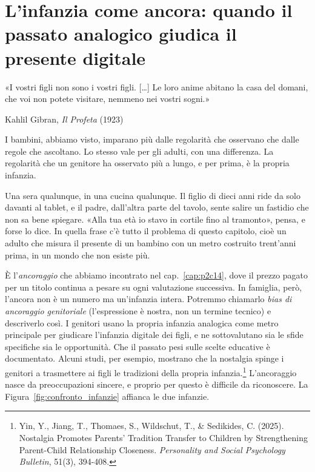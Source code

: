 \chapter{L'infanzia come ancora: quando il passato analogico giudica il presente digitale}
\label{cap:p2c29}

\epigraph{«I vostri figli non sono i vostri figli. [\dots] Le loro anime abitano la casa del domani, che voi non potete visitare, nemmeno nei vostri sogni.»}{Kahlil Gibran, \textit{Il Profeta} (1923)}

I bambini, abbiamo visto, imparano più dalle regolarità che osservano che dalle regole che ascoltano. Lo stesso vale per gli adulti, con una differenza. La regolarità che un genitore ha osservato più a lungo, e per prima, è la propria infanzia.

Una sera qualunque, in una cucina qualunque. Il figlio di dieci anni ride da solo davanti al tablet, e il padre, dall'altra parte del tavolo, sente salire un fastidio che non sa bene spiegare. «Alla tua età io stavo in cortile fino al tramonto», pensa, e forse lo dice. In quella frase c'è tutto il problema di questo capitolo, cioè un adulto che misura il presente di un bambino con un metro costruito trent'anni prima, in un mondo che non esiste più.

È l'\textit{ancoraggio} che abbiamo incontrato nel cap.~\ref{cap:p2c14}, dove il prezzo pagato per un titolo continua a pesare su ogni valutazione successiva. In famiglia, però, l'ancora non è un numero ma un'infanzia intera. Potremmo chiamarlo \textit{bias di ancoraggio genitoriale} (l'espressione è nostra, non un termine tecnico) e descriverlo così. I genitori usano la propria infanzia analogica come metro principale per giudicare l'infanzia digitale dei figli, e ne sottovalutano sia le sfide specifiche sia le opportunità. Che il passato pesi sulle scelte educative è documentato. Alcuni studi, per esempio, mostrano che la nostalgia spinge i genitori a trasmettere ai figli le tradizioni della propria infanzia.\footnote{Yin, Y., Jiang, T., Thomaes, S., Wildschut, T., \& Sedikides, C. (2025). Nostalgia Promotes Parents' Tradition Transfer to Children by Strengthening Parent-Child Relationship Closeness. \textit{Personality and Social Psychology Bulletin}, 51(3), 394-408.} L'ancoraggio nasce da preoccupazioni sincere, e proprio per questo è difficile da riconoscere. La Figura~\ref{fig:confronto_infanzie} affianca le due infanzie.


